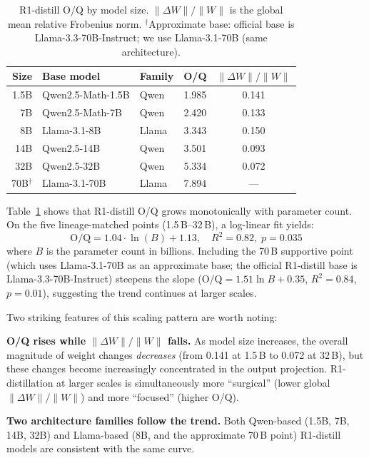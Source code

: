 \documentclass[11pt]{article}
\newcommand{\oq}{\text{O/Q}}
\newcommand{\dwnorm}{\|\Delta W\|/\|W\|}
\begin{document}
\begin{table}[t]
\centering
\caption{R1-distill O/Q by model size.
$\dwnorm$ is the global mean relative Frobenius norm.
$^\dagger$Approximate base: official base is Llama-3.3-70B-Instruct;
we use Llama-3.1-70B (same architecture).}
\label{tab:scaling}
\begin{tabular}{rllcc}
\toprule
Size & Base model & Family & O/Q & $\dwnorm$ \\
\midrule
1.5B & Qwen2.5-Math-1.5B & Qwen & 1.985 & 0.141 \\
7B & Qwen2.5-Math-7B & Qwen & 2.420 & 0.133 \\
8B & Llama-3.1-8B & Llama & 3.343 & 0.150 \\
14B & Qwen2.5-14B & Qwen & 3.501 & 0.093 \\
32B & Qwen2.5-32B & Qwen & 5.334 & 0.072 \\
70B$^\dagger$ & Llama-3.1-70B & Llama & 7.894 & --- \\
\bottomrule
\end{tabular}
\end{table}

Table~\ref{tab:scaling} shows that R1-distill O/Q grows monotonically with
parameter count.
On the five lineage-matched points (1.5\,B--32\,B), a log-linear fit yields:
\begin{equation}
  \oq = 1.04 \cdot \ln(B) + 1.13, \quad R^2 = 0.82, \; p = 0.035
  \label{eq:scaling}
\end{equation}
where $B$ is the parameter count in billions.
Including the 70\,B supportive point (which uses Llama-3.1-70B as an approximate
base; the official R1-distill base is Llama-3.3-70B-Instruct) steepens the
slope ($\oq = 1.51 \ln B + 0.35$, $R^2 = 0.84$, $p = 0.01$), suggesting
the trend continues at larger scales.

Two striking features of this scaling pattern are worth noting:

\textbf{O/Q rises while $\dwnorm$ falls.}
As model size increases, the overall magnitude of weight changes
\emph{decreases} (from 0.141 at 1.5\,B to 0.072 at 32\,B), but these changes
become increasingly concentrated in the output projection.
R1-distillation at larger scales is simultaneously more ``surgical'' (lower
global $\dwnorm$) and more ``focused'' (higher O/Q).

\textbf{Two architecture families follow the trend.}
Both Qwen-based (1.5B, 7B, 14B, 32B) and Llama-based (8B, and the approximate
70\,B point) R1-distill models are consistent with the same curve.
\end{document}
